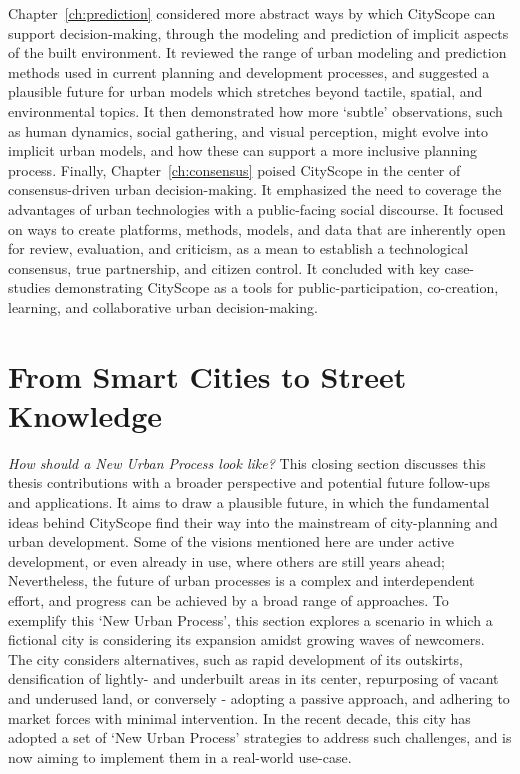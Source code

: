 {    \newline
    Chapter~\eqref{ch:prediction} considered more abstract ways by which CityScope can support decision-making, through the modeling and prediction of implicit aspects of the built environment. It reviewed the range of urban modeling and prediction methods used in current planning and development processes, and suggested a plausible future for urban models which stretches beyond tactile, spatial, and environmental topics. It then demonstrated how more `subtle' observations, such as human dynamics, social gathering, and visual perception, might evolve into implicit urban models, and how these can support a more inclusive planning process.
    \newline
    Finally, Chapter~\eqref{ch:consensus} poised CityScope in the center of consensus-driven urban decision-making. It emphasized the need to coverage the advantages of urban technologies with a public-facing social discourse. It focused on ways to create platforms, methods, models, and data that are inherently open for review, evaluation, and criticism, as a mean to establish a technological consensus, true partnership, and citizen control.
    It concluded with key case-studies demonstrating CityScope as a tools for public-participation, co-creation, learning, and collaborative urban decision-making.


    \section{From Smart Cities to Street Knowledge}
     {
      \textit{How should a New Urban Process look like?} This closing section discusses this thesis contributions with a broader perspective and potential future follow-ups and applications. It aims to draw a plausible future, in which the fundamental ideas behind CityScope find their way into the mainstream of city-planning and urban development. Some of the visions mentioned here are under active development, or even already in use, where others are still years ahead; Nevertheless, the future of urban processes is a complex and interdependent effort, and progress can be achieved by a broad range of approaches.
      \newline
      To exemplify this `New Urban Process', this section explores a scenario in which a fictional city is considering its expansion amidst growing waves of newcomers. The city considers alternatives, such as rapid development of its outskirts, densification of lightly- and underbuilt areas in its center, repurposing of vacant and underused land, or conversely - adopting a passive approach, and adhering to market forces with minimal intervention. In the recent decade, this city has adopted a set of `New Urban Process' strategies to address such challenges, and is now aiming to implement them in a real-world use-case.


}}
